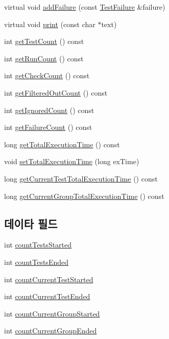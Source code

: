 \begin{DoxyCompactItemize}
virtual void \hyperlink{class_test_result_a72cba7b88c906f8f5af977d360bd8c23}{add\+Failure} (const \hyperlink{class_test_failure}{Test\+Failure} \&failure)
\item 
virtual void \hyperlink{class_test_result_aeee8b15298e1baa2d0ced78c1fcb4b90}{print} (const char $\ast$text)
\item 
int \hyperlink{class_test_result_a1c38e7dbb03d19b1a5845926f64bde9f}{get\+Test\+Count} () const 
\item 
int \hyperlink{class_test_result_a4e700cf300b5d035a06f9e74eaf50d78}{get\+Run\+Count} () const 
\item 
int \hyperlink{class_test_result_a4627b4853142292095fb390fef6f7ac4}{get\+Check\+Count} () const 
\item 
int \hyperlink{class_test_result_a81edc31ea12701eea6c2c083a54d71ae}{get\+Filtered\+Out\+Count} () const 
\item 
int \hyperlink{class_test_result_a66d58d823113bebd2b40bef293ccc5e9}{get\+Ignored\+Count} () const 
\item 
int \hyperlink{class_test_result_abb8c64011fa53bb1950110a564b56027}{get\+Failure\+Count} () const 
\item 
long \hyperlink{class_test_result_abdeef3479981cd95bb8327312249ffe6}{get\+Total\+Execution\+Time} () const 
\item 
void \hyperlink{class_test_result_a029210c21429a61982185a85b5c022b4}{set\+Total\+Execution\+Time} (long ex\+Time)
\item 
long \hyperlink{class_test_result_a3c06bb4516065fd2ba57231e246002e9}{get\+Current\+Test\+Total\+Execution\+Time} () const 
\item 
long \hyperlink{class_test_result_a15ba962bc1cfa2e7c6ca02ba4c37e76c}{get\+Current\+Group\+Total\+Execution\+Time} () const 
\end{DoxyCompactItemize}
\subsection*{데이타 필드}
\begin{DoxyCompactItemize}
\item 
int \hyperlink{class_mock_test_result_ad3b398c9c6074906f6614232853b0dab}{count\+Tests\+Started}
\item 
int \hyperlink{class_mock_test_result_ae36e823016b474b806feeca37b6fa116}{count\+Tests\+Ended}
\item 
int \hyperlink{class_mock_test_result_a82901871bc09b0d608c07cf130cc6eab}{count\+Current\+Test\+Started}
\item 
int \hyperlink{class_mock_test_result_a12a5dd36206618671dfe46b40eb9965b}{count\+Current\+Test\+Ended}
\item 
int \hyperlink{class_mock_test_result_aa2c53e1231fb150773dd07317a558cb8}{count\+Current\+Group\+Started}
\item 
int \hyperlink{class_mock_test_result_a456443709f7927ab308b7823d71a3c5e}{count\+Current\+Group\+Ended}
\end{DoxyCompactItemize}


